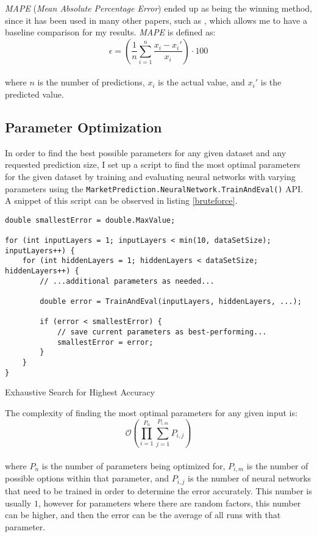 \documentclass[a4paper,12pt]{article}
\begin{document}
	\textit{MAPE} (\textit{Mean Absolute Percentage Error}) ended up as being the winning method, since it has been used in many other papers, such as \cite{majhi2009efficient}, which allows me to have a baseline comparison for my results. \textit{MAPE} is defined as:\\
	$$ \epsilon = (\frac{1}{n} \sum_{i=1}^{n} \frac{x_i - x_i'}{x_i}) \cdot 100 $$\\
	where $n$ is the number of predictions, $x_i$ is the actual value, and $x_i'$ is the predicted value.
	
\subsection{Parameter Optimization} \label{paramopt}
	
	In order to find the best possible parameters for any given dataset and any requested prediction size, I set up a script to find the most optimal parameters for the given dataset by training and evaluating neural networks with varying parameters using the \texttt{MarketPrediction.NeuralNetwork.TrainAndEval()} API. A snippet of this script can be observed in listing \ref{bruteforce}.
	
	\begin{listing}[!htbp]
		\begin{verbatim}
double smallestError = double.MaxValue;

for (int inputLayers = 1; inputLayers < min(10, dataSetSize); inputLayers++) {
	for (int hiddenLayers = 1; hiddenLayers < dataSetSize; hiddenLayers++) {
		// ...additional parameters as needed...
		
		double error = TrainAndEval(inputLayers, hiddenLayers, ...);
		
		if (error < smallestError) {
			// save current parameters as best-performing...
			smallestError = error;
		}
	}
}
		\end{verbatim}
		\caption{Exhaustive Search for Highest Accuracy}
		\label{bruteforce}
	\end{listing}
	
\newpage
	The complexity of finding the most optimal parameters for any given input is:\\
	$$ \mathcal{O}(\prod_{i=1}^{P_n} \sum_{j=1}^{P_{i,m}} P_{i,j}) $$\\
	where $P_n$ is the number of parameters being optimized for, $P_{i,m}$ is the number of possible options within that parameter, and $P_{i,j}$ is the number of neural networks that need to be trained in order to determine the error accurately. This number is usually $1$, however for parameters where there are random factors, this number can be higher, and then the error can be the average of all runs with that parameter.
	
\end{document}
